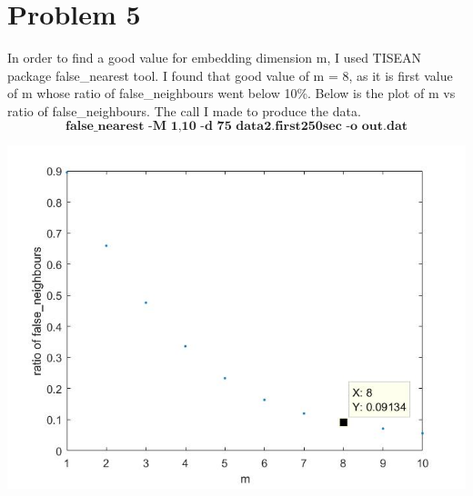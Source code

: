 \documentclass{article}
\begin{document}
\section*{Problem 5}
In order to find a good value for embedding dimension m, I used TISEAN package false\_nearest tool. I found that good value of m = 8, as it is first value of m whose ratio of false\_neighbours went below 10\%. Below is the plot of m vs ratio of false\_neighbours. The call I made to produce the data.
$$\textbf{false\_nearest -M 1,10 -d 75 data2.first250sec -o out.dat}$$
\begin{minipage}{\linewidth}
{
\centering 
\includegraphics[scale=0.45]{images/prob5.jpg}
\label{fig:prob5}
}
\end{minipage}
\end{document}
